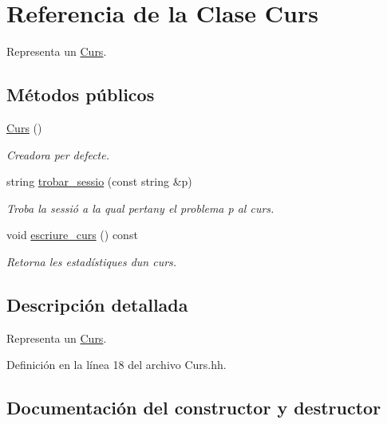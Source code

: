 \hypertarget{class_curs}{}\section{Referencia de la Clase Curs}
\label{class_curs}


Representa un \mbox{\hyperlink{class_curs}{Curs}}.  


\subsection*{Métodos públicos}
\begin{DoxyCompactItemize}
\item 
\mbox{\hyperlink{class_curs_acecd9c67882f6d09fc15fb822420e245}{Curs}} ()
\begin{DoxyCompactList}\small\item\em Creadora per defecte. \end{DoxyCompactList}\item 
string \mbox{\hyperlink{class_curs_ab9c0e100a9c7231c5c96911c94602fff}{trobar\+\_\+sessio}} (const string \&p)
\begin{DoxyCompactList}\small\item\em Troba la sessió a la qual pertany el problema {\itshape p} al curs. \end{DoxyCompactList}\item 
void \mbox{\hyperlink{class_curs_a54b500f472e5ae51395bca6fe1e0bd09}{escriure\+\_\+curs}} () const
\begin{DoxyCompactList}\small\item\em Retorna les estadístiques d\textquotesingle{}un curs. \end{DoxyCompactList}\end{DoxyCompactItemize}


\subsection{Descripción detallada}
Representa un \mbox{\hyperlink{class_curs}{Curs}}. 

Definición en la línea 18 del archivo Curs.\+hh.



\subsection{Documentación del constructor y destructor}
\mbox{\label{class_curs_acecd9c67882f6d09fc15fb822420e245}} 
